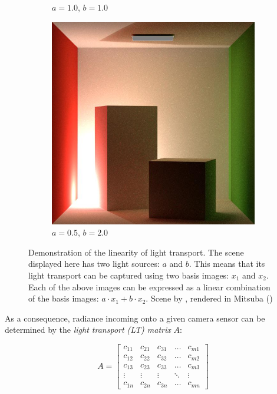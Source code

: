 \begin{figure}[ht]
\begin{subfigure}[b]{0.24\textwidth}
        \caption*{\(a = 1.0\), \(b = 1.0\)}
    \end{subfigure}
    \hfill
    \begin{subfigure}[b]{0.24\textwidth}
        \centering
        \includegraphics[width=\textwidth]{images/02-linear_lt_comb2.jpg}
        \caption*{\(a = 0.5\), \(b = 2.0\)}
    \end{subfigure}
    \caption{Demonstration of the linearity of light transport. The scene displayed here has two light sources: \(a\) and \(b\). This means that its light transport can be captured using two basis images: \(x_1\) and \(x_2\). Each of the above images can be expressed as a linear combination of the basis images: \(a \cdot x_1 + b \cdot x_2\). Scene by \citet{Bitterli16}, rendered in Mitsuba (\citet{Mitsuba})}
    \label{fig:background_linear_lt}
\end{figure}

As a consequence, radiance incoming onto a given camera sensor can be determined by the \textit{light transport (LT) matrix} \(A\):

\begin{equation}
    \label{eq:lt_matrix}
    A = \begin{bmatrix}
        c_{11} & c_{21} & c_{31} & \dots & c_{m1} \\
        c_{12} & c_{22} & c_{32} & \dots & c_{m2} \\
        c_{13} & c_{23} & c_{33} & \dots & c_{m3} \\
        \vdots & \vdots & \vdots & \ddots & \vdots \\
        c_{1n} & c_{2n} & c_{3n} & \dots & c_{mn}
    \end{bmatrix}
\end{equation}

